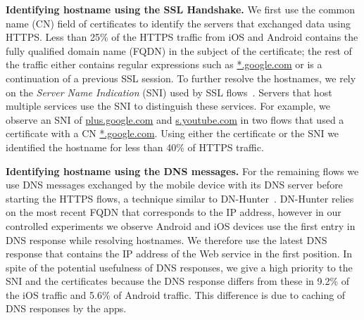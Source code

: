 \noindent\textbf{Identifying hostname using the SSL Handshake.}
We first use the common name (CN) field of certificates to identify the servers that exchanged data using HTTPS.
Less than 25\% of the HTTPS traffic from iOS and Android contains the fully qualified domain name (FQDN) in the subject of the certificate; the rest of the traffic either contains regular expressions such as \url{*.google.com} or is a continuation of a previous SSL session. 
To further resolve the hostnames, we rely on the \emph{Server Name Indication} (SNI) used by SSL flows~\cite{rfc:servernametls}.
Servers that host multiple services use the SNI to distinguish these services.   
For example, we observe an SNI of \url{plus.google.com} and \url{s.youtube.com} in two flows that used a certificate with a CN \url{*.google.com}.
Using either the certificate or the SNI we identified the hostname for	 less than 40\% of HTTPS traffic.

\noindent\textbf{Identifying hostname using the DNS messages.} 
For the remaining flows we use DNS messages exchanged by the mobile device with its DNS server before starting the HTTPS flows, a technique similar to DN-Hunter~\cite{bermudez:dnhunter}.
DN-Hunter relies on the most recent FQDN that corresponds to the IP address, however in our controlled experiments we observe Android and iOS devices use the first entry in DNS response while resolving hostnames.
We therefore use the latest DNS response that contains the IP address of the Web service in the first position.
In spite of the potential usefulness of DNS responses, we give a high priority to the SNI and the certificates because the DNS response differs from these in 9.2\% of the iOS traffic and 5.6\% of Android traffic.
This difference is due to caching of DNS responses by the apps.

